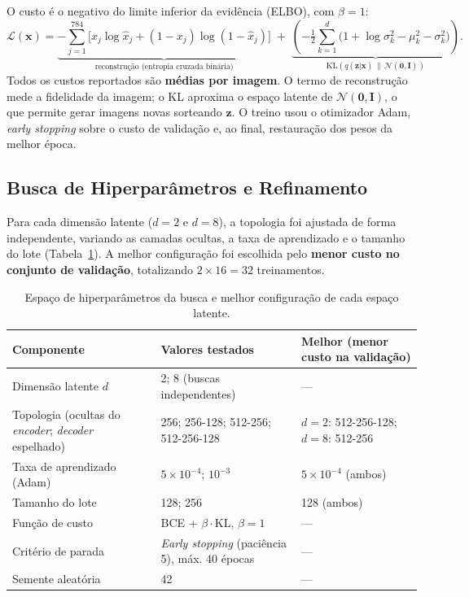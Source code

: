 \documentclass[11pt,a4paper]{article}
\begin{document}
O custo é o negativo do limite inferior da evidência (ELBO), com $\beta=1$:
\begin{equation}
\mathcal{L}(\mathbf{x}) = \underbrace{-\sum_{j=1}^{784}\big[x_j\log\hat{x}_j+(1-x_j)\log(1-\hat{x}_j)\big]}_{\text{reconstrução (entropia cruzada binária)}} \;+\; \underbrace{\left(-\tfrac{1}{2}\sum_{k=1}^{d}\big(1+\log\sigma_k^2-\mu_k^2-\sigma_k^2\big)\right)}_{\mathrm{KL}\left(q(\mathbf{z}|\mathbf{x})\,\|\,\mathcal{N}(\mathbf{0},\mathbf{I})\right)}.
\end{equation}
Todos os custos reportados são \textbf{médias por imagem}. O termo de reconstrução mede a fidelidade da imagem; o KL aproxima o espaço latente de $\mathcal{N}(\mathbf{0},\mathbf{I})$, o que permite gerar imagens novas sorteando $\mathbf{z}$. O treino usou o otimizador Adam, \textit{early stopping} sobre o custo de validação e, ao final, restauração dos pesos da melhor época.

\subsection{Busca de Hiperparâmetros e Refinamento}
Para cada dimensão latente ($d=2$ e $d=8$), a topologia foi ajustada de forma independente, variando as camadas ocultas, a taxa de aprendizado e o tamanho do lote (Tabela~\ref{tab:hiper}). A melhor configuração foi escolhida pelo \textbf{menor custo no conjunto de validação}, totalizando $2\times16=32$ treinamentos.

\begin{table}[h]
\centering
\small
\caption{Espaço de hiperparâmetros da busca e melhor configuração de cada espaço latente.}
\label{tab:hiper}
\begin{tabularx}{\textwidth}{lXX}
\toprule
\textbf{Componente} & \textbf{Valores testados} & \textbf{Melhor (menor custo na validação)} \\
\midrule
Dimensão latente $d$ & 2; 8 (buscas independentes) & --- \\
Topologia (ocultas do \textit{encoder}; \textit{decoder} espelhado) & 256; 256-128; 512-256; 512-256-128 & $d=2$: 512-256-128; \; $d=8$: 512-256 \\
Taxa de aprendizado (Adam) & $5\times10^{-4}$; $10^{-3}$ & $5\times10^{-4}$ (ambos) \\
Tamanho do lote & 128; 256 & 128 (ambos) \\
Função de custo & BCE + $\beta\cdot$KL, $\beta=1$ & --- \\
Critério de parada & \textit{Early stopping} (paciência 5), máx. 40 épocas & --- \\ Semente aleatória & 42 & --- \\
\bottomrule
\end{tabularx}
\end{table}
\end{document}

